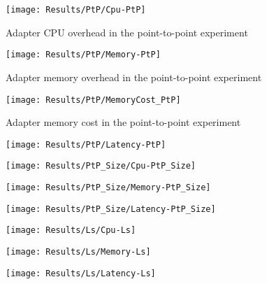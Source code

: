 \begin{figure}[htbp]
    \centering
    \texttt{[image: Results/PtP/Cpu-PtP]}
    \caption{Adapter CPU overhead in the point-to-point experiment}
    \label{fig:cpuPtp}
\end{figure}

\begin{figure}[htbp]
    \centering
    \texttt{[image: Results/PtP/Memory-PtP]}
    \caption{Adapter memory overhead in the point-to-point experiment}
    \label{fig:memPtp}
\end{figure}

\begin{figure}[htbp]
    \centering
    \texttt{[image: Results/PtP/MemoryCost\_PtP]}
    \caption{Adapter memory cost in the point-to-point experiment}
    \label{fig:memCostPtp}
\end{figure}

\begin{figure}[htbp]
    \centering
    \texttt{[image: Results/PtP/Latency-PtP]}
    \label{fig:gantt}
\end{figure}

\begin{figure}[htbp]
    \centering
    \texttt{[image: Results/PtP\_Size/Cpu-PtP\_Size]}
    \label{fig:gantt}
\end{figure}

\begin{figure}[htbp]
    \centering
    \texttt{[image: Results/PtP\_Size/Memory-PtP\_Size]}
    \label{fig:gantt}
\end{figure}

\begin{figure}[htbp]
    \centering
    \texttt{[image: Results/PtP\_Size/Latency-PtP\_Size]}
    \label{fig:gantt}
\end{figure}

\begin{figure}[htbp]
    \centering
    \texttt{[image: Results/Ls/Cpu-Ls]}
    \label{fig:gantt}
\end{figure}

\begin{figure}[htbp]
    \centering
    \texttt{[image: Results/Ls/Memory-Ls]}
    \label{fig:gantt}
\end{figure}

\begin{figure}[htbp]
    \centering
    \texttt{[image: Results/Ls/Latency-Ls]}
    \label{fig:gantt}
\end{figure}

